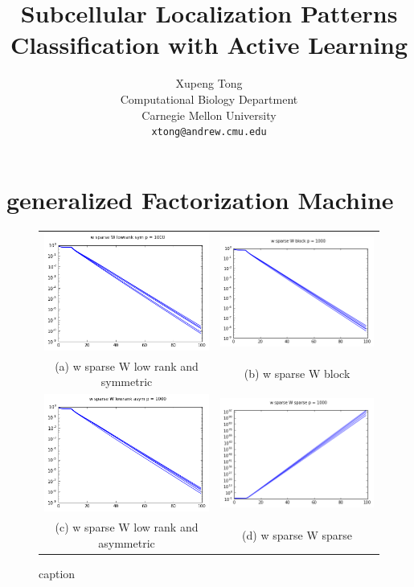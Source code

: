 \documentclass{article}
\title{Subcellular Localization Patterns Classification with Active Learning}
\author{
  Xupeng Tong\\
  Computational Biology Department\\
  Carnegie Mellon University\\
  \texttt{xtong@andrew.cmu.edu} \\
}
\begin{document}

\section{generalized Factorization Machine}

\begin{figure}
\begin{tabular}{cc}
  \includegraphics[width=65mm]{gfm_plots/w_sparse_W_lowrank_sym.png} &   \includegraphics[width=65mm]{gfm_plots/w_sparse_W_block} \\
(a) w sparse W low rank and symmetric & (b) w sparse W block \\[6pt]
 \includegraphics[width=65mm]{gfm_plots/w_sparse_W_lowrank_asym} &   \includegraphics[width=65mm]{gfm_plots/w_sparse_W_lowrank_sparse} \\
(c) w sparse W low rank and asymmetric & (d) w sparse W sparse \\[6pt]
\end{tabular}
\caption{caption}
\end{figure}
\end{document}
